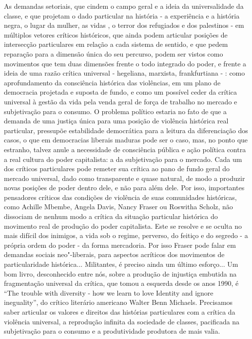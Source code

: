 As demandas setoriais, que cindem o campo geral e a ideia da
universalidade da classe, e que projetam o dado particular na história -
a experiência e a história negra, o lugar da mulher, as vidas , o
terror dos refugiados e dos palestinos - em múltiplos vetores críticos
históricos, que ainda podem articular posições de intersecção
particulares em relação a cada sistema de sentido, e que pedem reparação
para a dimensão única do seu percurso, podem ser vistos como movimentos
que tem duas dimensões frente o todo integrado do poder, e frente a
ideia de uma razão crítica universal - hegeliana, marxista,
frankfurtiana - : como aprofundamento da consciência histórica das
violências, em um plano de democracia projetada e suposta de fundo, e
como um possível ceder da crítica universal à gestão da vida pela venda
geral de força de trabalho no mercado e subjetivação para o consumo. O
problema político estaria no fato de que a demanda de uma justiça única
para uma posição de violência histórica real particular, pressupõe
estabilidade democrática para a leitura da diferenciação dos casos, o
que em democracias liberais maduras pode ser o caso, mas, no ponto que
estranho, talvez anule a necessidade de consciência pública e ação
política contra a real cultura do poder capitalista: a da subjetivação
para o mercado. Cada um dos críticos particulares pode remeter sua
crítica ao pano de fundo geral do mercado universal, dado como
transparente e quase natural, de modo a produzir novas posições de poder
dentro dele, e não para além dele. Por isso, importantes pensadores
críticos das condições de violência de suas comunidades históricas, como
Achille Mbembe, Angela Davis, Nancy Fraser ou Roswitha Scholz, não
dissociam de nenhum modo a crítica da situação particular histórica do
movimento real de produção do poder capitalista. Este se resolve e se
oculta no mais difícil dos inimigos, a vida sob o regime, perverso, do
feitiço e do segredo - a própria ordem do poder - da forma mercadoria.
Por isso Fraser pode falar em demandas sociais neo"-liberais, para
aspectos acríticos dos movimentos de particularidade histórica...
Militantes, é preciso ainda um último esforço... Um bom livro,
desconhecido entre nós, sobre a produção de injustiça embutida na
fragmentação universal da crítica, que tomou a esquerda desde os anos
1990, é ``The trouble with diversity - how we learn to love Identity and
ignore ineguality'', do crítico literário americano Walter Benn
Michaels. Precisamos saber articular os valores e direitos das histórias
particulares com a crítica da violência universal, a reprodução infinita
da sociedade de classes, pacificada na subjetivação para o consumo e a
produtividade produtora de mais valia.

